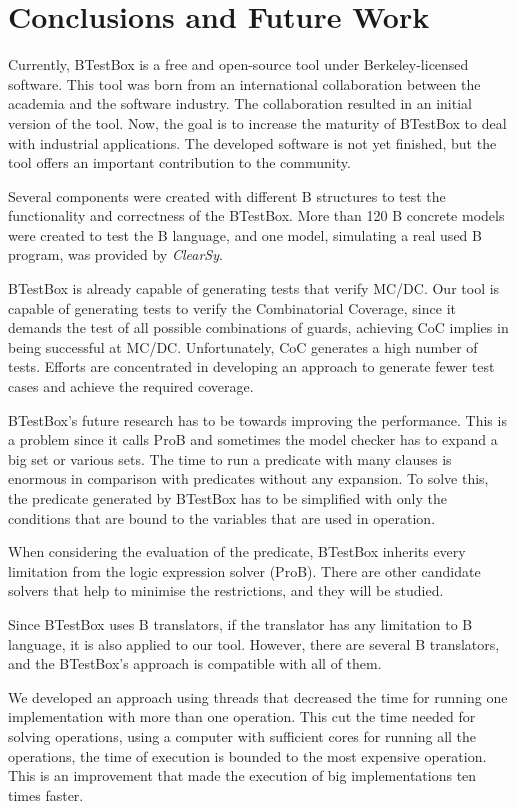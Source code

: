 \documentclass[runningheads]{llncs}
\begin{document}
\section{Conclusions and Future Work} \label{sec:Conclusion}

Currently, BTestBox is a free and open-source tool under Berkeley-licensed software.
This tool was born from an international collaboration between the academia and the software industry. The collaboration resulted in an initial version of the tool. Now, the goal is to increase the maturity of BTestBox to deal with industrial applications.
The developed software is not yet finished, but the tool offers an important contribution to the community.

Several components were created with different B structures to test the functionality and correctness of the BTestBox. More than 120 B concrete models were created to test the B language, and one model, simulating a real used B program, was provided by \textit{ClearSy}.

BTestBox is already capable of generating tests that verify MC/DC. Our tool is capable of generating tests to verify the Combinatorial Coverage, since it demands the test of all possible combinations of guards, achieving CoC implies in being successful at MC/DC. Unfortunately, CoC generates a high number of tests. Efforts are concentrated in developing an approach to generate fewer test cases and achieve the required coverage.

BTestBox's future research has to be towards improving the performance. This is a problem since it calls ProB and sometimes the model checker has to expand a big set or various sets. The time to run a predicate with many clauses is enormous in comparison with predicates without any expansion. To solve this, the predicate generated by BTestBox has to be simplified with only the conditions that are bound to the variables that are used in operation.

When considering the evaluation of the predicate, BTestBox inherits every limitation from the logic expression solver (ProB). There are other candidate solvers that help to minimise the restrictions, and they will be studied.

Since BTestBox uses B translators, if the translator has any limitation to B language, it is also applied to our tool. However, there are several B translators, and the BTestBox's approach is compatible with all of them. 

We developed an approach using threads that decreased the time for running one implementation with more than one operation. This cut the time needed for solving operations, using a computer with sufficient cores for running all the operations, the time of execution is bounded to the most expensive operation. This is an improvement that made the execution of big implementations ten times faster.
\end{document}
